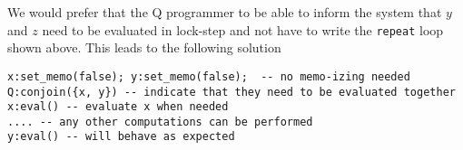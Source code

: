 We would prefer that the Q programmer to be able to
inform the system that \(y\) and \(z\) need to be evaluated in lock-step 
and not have to write the {\tt repeat} loop shown above. This leads to the
following solution

\begin{verbatim}
x:set_memo(false); y:set_memo(false);  -- no memo-izing needed
Q:conjoin({x, y}) -- indicate that they need to be evaluated together
x:eval() -- evaluate x when needed
.... -- any other computations can be performed
y:eval() -- will behave as expected
\end{verbatim}
